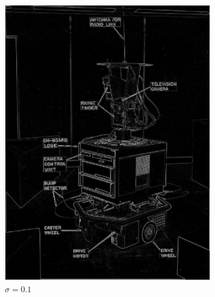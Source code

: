 \documentclass[lettersize,journal]{IEEEtran}
\begin{document}
\begin{figure}[h]
\begin{subfigure}[h]{0.115\textwidth}
        \includegraphics[width=\linewidth]{gaussian_edge_map_5x5_sigma_0.1}
        \caption{$\sigma=0.1$}  
    \end{subfigure}
    \begin{subfigure}[h]{0.115\textwidth}
        \centering 

\end{subfigure}
\end{figure}
\end{document}
